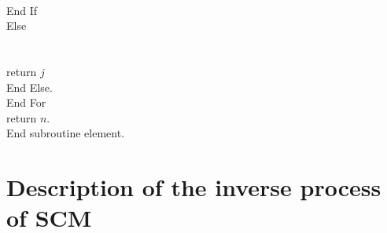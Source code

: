 \documentclass{amsart}
\begin{document}
    \indent \indent {}\\
    \indent \indent End If\\
    \indent \indent Else\\
    \indent \indent {}\\
    \indent \indent {}\\
    \indent \indent \indent return {$j$}\\
    \indent \indent End Else.\\
  \indent End For \\
    return {$n$}.\\
    End subroutine element.

\section*{Description of the inverse process of SCM}
\end{document}
